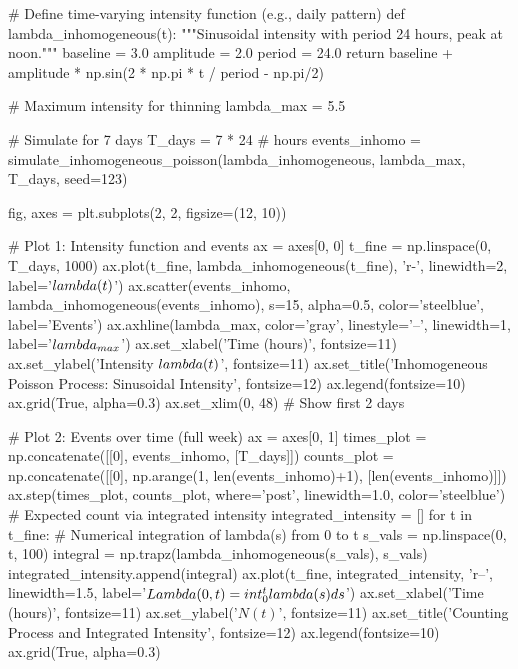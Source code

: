 \documentclass[a4paper, 11pt]{article}
\begin{document}
\begin{pycode}
# Define time-varying intensity function (e.g., daily pattern)
def lambda_inhomogeneous(t):
    """Sinusoidal intensity with period 24 hours, peak at noon."""
    baseline = 3.0
    amplitude = 2.0
    period = 24.0
    return baseline + amplitude * np.sin(2 * np.pi * t / period - np.pi/2)

# Maximum intensity for thinning
lambda_max = 5.5

# Simulate for 7 days
T_days = 7 * 24  # hours
events_inhomo = simulate_inhomogeneous_poisson(lambda_inhomogeneous, lambda_max, T_days, seed=123)

fig, axes = plt.subplots(2, 2, figsize=(12, 10))

# Plot 1: Intensity function and events
ax = axes[0, 0]
t_fine = np.linspace(0, T_days, 1000)
ax.plot(t_fine, lambda_inhomogeneous(t_fine), 'r-', linewidth=2, label='$\\lambda(t)$')
ax.scatter(events_inhomo, lambda_inhomogeneous(events_inhomo), s=15, alpha=0.5,
           color='steelblue', label='Events')
ax.axhline(lambda_max, color='gray', linestyle='--', linewidth=1, label='$\\lambda_{max}$')
ax.set_xlabel('Time (hours)', fontsize=11)
ax.set_ylabel('Intensity $\\lambda(t)$', fontsize=11)
ax.set_title('Inhomogeneous Poisson Process: Sinusoidal Intensity', fontsize=12)
ax.legend(fontsize=10)
ax.grid(True, alpha=0.3)
ax.set_xlim(0, 48)  # Show first 2 days

# Plot 2: Events over time (full week)
ax = axes[0, 1]
times_plot = np.concatenate([[0], events_inhomo, [T_days]])
counts_plot = np.concatenate([[0], np.arange(1, len(events_inhomo)+1), [len(events_inhomo)]])
ax.step(times_plot, counts_plot, where='post', linewidth=1.0, color='steelblue')
# Expected count via integrated intensity
integrated_intensity = []
for t in t_fine:
    # Numerical integration of lambda(s) from 0 to t
    s_vals = np.linspace(0, t, 100)
    integral = np.trapz(lambda_inhomogeneous(s_vals), s_vals)
    integrated_intensity.append(integral)
ax.plot(t_fine, integrated_intensity, 'r--', linewidth=1.5,
        label='$\\Lambda(0,t) = \\int_0^t \\lambda(s) ds$')
ax.set_xlabel('Time (hours)', fontsize=11)
ax.set_ylabel('$N(t)$', fontsize=11)
ax.set_title('Counting Process and Integrated Intensity', fontsize=12)
ax.legend(fontsize=10)
ax.grid(True, alpha=0.3)


\end{pycode}
\end{document}
